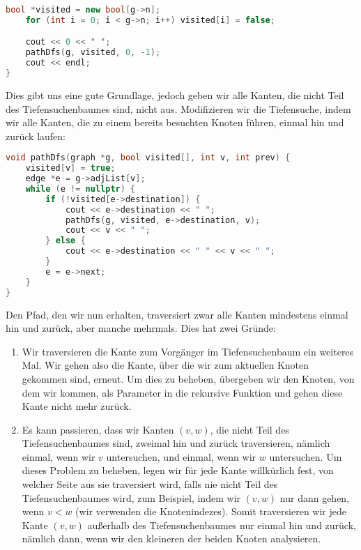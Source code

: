 \documentclass[11pt,a4paper]{article}
\begin{document}
\begin{loesung}
\begin{enumerate}
\begin{lstlisting}[language=c++]
    bool *visited = new bool[g->n];
    for (int i = 0; i < g->n; i++) visited[i] = false;

    cout << 0 << " ";
    pathDfs(g, visited, 0, -1);
    cout << endl;
}
        \end{lstlisting}
        Dies gibt uns eine gute Grundlage, jedoch geben wir alle Kanten, die nicht Teil des Tiefensuchenbaumes sind, nicht aus.
        Modifizieren wir die Tiefensuche, indem wir alle Kanten, die zu einem bereits besuchten Knoten führen, einmal hin und zurück laufen:
        \begin{lstlisting}[language=c++]
void pathDfs(graph *g, bool visited[], int v, int prev) {
    visited[v] = true;
    edge *e = g->adjList[v];
    while (e != nullptr) {
        if (!visited[e->destination]) {
            cout << e->destination << " ";
            pathDfs(g, visited, e->destination, v);
            cout << v << " ";
        } else {
            cout << e->destination << " " << v << " ";
        }
        e = e->next;
    }
}
        \end{lstlisting}
        Den Pfad, den wir nun erhalten, traversiert zwar alle Kanten mindestens einmal hin und zurück, aber manche mehrmals.
        Dies hat zwei Gründe:
        \begin{enumerate}[label=\arabic*.]
            \item Wir traversieren die Kante zum Vorgänger im Tiefensuchenbaum ein weiteres Mal.
            Wir gehen also die Kante, über die wir zum aktuellen Knoten gekommen sind, erneut.
            Um dies zu beheben, übergeben wir den Knoten, von dem wir kommen, als Parameter in die rekursive Funktion und gehen diese Kante nicht mehr zurück.
            \item 
            Es kann passieren, dass wir Kanten $(v, w)$, die nicht Teil des Tiefensuchenbaumes sind, zweimal hin und zurück traversieren, nämlich einmal, wenn wir $v$ untersuchen, und einmal, wenn wir $w$ untersuchen.
            Um dieses Problem zu beheben, legen wir für jede Kante willkürlich fest, von welcher Seite aus sie traversiert wird, falls nie nicht Teil des Tiefensuchenbaumes wird, zum Beispiel, indem wir $(v, w)$ nur dann gehen, wenn $v < w$ (wir verwenden die Knotenindezes).
            Somit traversieren wir jede Kante $(v, w)$ außerhalb des Tiefensuchenbaumes nur einmal hin und zurück, nämlich dann, wenn wir den kleineren der beiden Knoten analysieren.
        \end{enumerate}

\end{enumerate}
\end{loesung}
\end{document}
